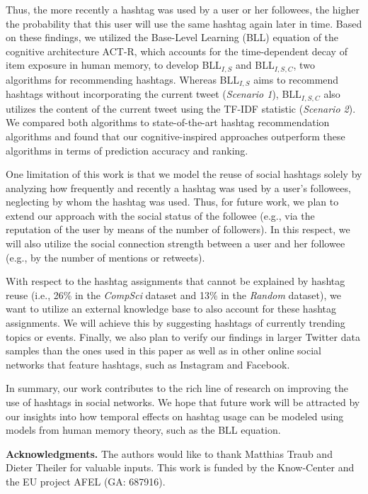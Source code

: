 \documentclass{sig-alternate-05-2015}
\newcommand{\para}[1]{\vspace{2mm}\noindent\textbf{#1}}
\begin{document}
Thus, the more recently a hashtag was used by a user or her followees, the higher the probability that this user will use the same hashtag again later in time. Based on these findings, we utilized the Base-Level Learning (BLL) equation of the cognitive architecture ACT-R, which accounts for the time-dependent decay of item exposure in human memory, to develop BLL$_{I,S}${} and BLL$_{I,S,C}${}, two algorithms for recommending hashtags. Whereas BLL$_{I,S}${} aims to recommend hashtags without incorporating the current tweet (\textit{Scenario 1}{}), BLL$_{I,S,C}${} also utilizes the content of the current tweet using the TF-IDF statistic (\textit{Scenario 2}{}). We compared both algorithms to state-of-the-art hashtag recommendation algorithms and found that our cognitive-inspired approaches outperform these algorithms in terms of prediction accuracy and ranking.

One limitation of this work is that we model the reuse of social hashtags solely by analyzing how frequently and recently a hashtag was used by a user's followees, neglecting by whom the hashtag was used. Thus, for future work, we plan to extend our approach with the social status of the followee (e.g., via the reputation of the user by means of the number of followers). In this respect, we will also utilize the social connection strength between a user and her followee (e.g., by the number of mentions or retweets).

With respect to the hashtag assignments that cannot be explained by hashtag reuse (i.e., 26\% in the \textit{CompSci}{} dataset and 13\% in the \textit{Random}{} dataset), we want to utilize an external knowledge base to also account for these hashtag assignments. We will achieve this by suggesting hashtags of currently trending topics or events. Finally, we also plan to verify our findings in larger Twitter data samples than the ones used in this paper as well as in other online social networks that feature hashtags, such as Instagram and Facebook.
%

In summary, our work contributes to the rich line of research on improving the use of hashtags in social networks. We hope that future work will be attracted by our insights into how temporal effects on hashtag usage can be modeled using models from human memory theory, such as the BLL equation.

\para{Acknowledgments.} The authors would like to thank Matthias Traub and Dieter Theiler for valuable inputs. This work is funded by the Know-Center and the EU project AFEL (GA: 687916).

\small

\end{document}
